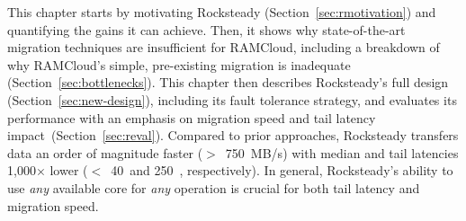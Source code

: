This chapter starts by motivating Rocksteady
(Section~\ref{sec:rmotivation}) and quantifying the
gains it can achieve. Then, it shows why state-of-the-art migration techniques
are insufficient for RAMCloud, including a breakdown of why RAMCloud's simple,
pre-existing migration is inadequate
(Section~\ref{sec:bottlenecks}). This chapter then describes Rocksteady's full design
(Section~\ref{sec:new-design}), including its fault tolerance strategy, and
evaluates
its performance with an emphasis on migration speed and tail latency
impact~(Section~\ref{sec:reval}).
Compared to prior approaches, Rocksteady transfers data an order of magnitude
faster ($>$~750~MB/s) with median and tail latencies 1,000$\times$ lower
($<$~40~\us and
250~\us, respectively). In general, Rocksteady's ability to use {\em any}
available core for {\em any} operation is crucial for both tail latency and
migration speed.
